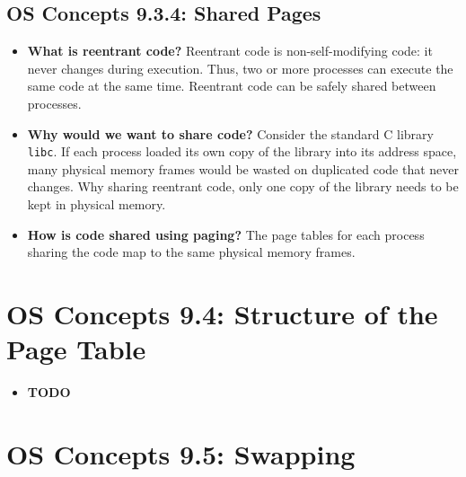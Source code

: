 \documentclass[12pt]{article}
\begin{document}
\subsection*{OS Concepts 9.3.4: Shared Pages}

\begin{itemize}
    \item \textbf{What is reentrant code?} Reentrant code is non-self-modifying code: it never changes during execution. Thus, two or more processes can execute the same code at the same time. Reentrant code can be safely shared between processes.
    \item \textbf{Why would we want to share code?} Consider the standard C library \texttt{libc}. If each process loaded its own copy of the library into its address space, many physical memory frames would be wasted on duplicated code that never changes. Why sharing reentrant code, only one copy of the library needs to be kept in physical memory.
    \item \textbf{How is code shared using paging?} The page tables for each process sharing the code map to the same physical memory frames.
\end{itemize}

\section*{OS Concepts 9.4: Structure of the Page Table}

\begin{itemize}
    \item \textbf{TODO}
\end{itemize}

\section*{OS Concepts 9.5: Swapping}
\end{document}
